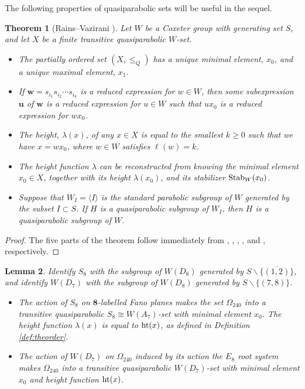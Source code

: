 \documentclass{amsart}
\theoremstyle{plain}
\newtheorem{theorem}{Theorem}[section]
\newtheorem{lemma}[theorem]{Lemma}
\theoremstyle{definition}
\theoremstyle{remark}
\numberwithin{equation}{section}
\newcommand{\bfw}{\mathbf{w}}
\newcommand{\Stab}{\text{\rm Stab}}
\newcommand{\rootht}{\text{\rm ht}}
\newcommand{\bfu}{\mathbf{u}}
\newcommand{\eight}{{\mathbf 8}}
\newcommand{\qpx}{\Omega_{240}}
\begin{document}
The following properties of quasiparabolic sets will be useful in the sequel.

\begin{theorem}[Rains--Vazirani \cite{rains13}]\label{thm:summary}
Let $W$ be a Coxeter group with generating set $S$, and let $X$ be a finite transitive quasiparabolic $W$-set.
\begin{itemize}
\item[{\rm (i)}]{The partially ordered set $(X, \leq_Q)$ has a unique minimal element, $x_0$, and a unique maximal
element, $x_1$.}
\item[{\rm (ii)}]{If $\bfw = s_{i_1} s_{i_2} \cdots s_{i_k}$ is a reduced expression for $w \in W$, then some 
subexpression $\bfu$ of $\bfw$ is a reduced expression for $u \in W$ such that $ux_0$ is a reduced expression
for $wx_0$.}
\item[{\rm (iii)}]{The height, $\lambda(x)$, of any $x \in X$ is equal to the smallest $k \geq 0$ such that we
have $x = w x_0$, where $w \in W$ satisfies $\ell(w) = k$.}
\item[{\rm (iv)}]{The height function $\lambda$ can be reconstructed from knowing the minimal element $x_0 \in X$,
together with its height $\lambda(x_0)$, and its stabilizer $\Stab_W(x_0)$.}
\item[{\rm (v)}]{Suppose that $W_I = \langle I \rangle$ is the standard parabolic subgroup of $W$ generated by
the subset $I \subset S$. If $H$ is a quasiparabolic subgroup of $W_I$, then $H$ is a quasiparabolic subgroup of $W$.}
\end{itemize}
\end{theorem}

\begin{proof}
The five parts of the theorem follow immediately from 
\cite[Corollary 2.10]{rains13}, \cite[Theorem 2.8 (ii)]{rains13}, \cite[Corollary 2.13]{rains13},
\cite[Proposition 2.15]{rains13}, and \cite[Corollary 3.10]{rains13}, respectively.
\end{proof}

\begin{lemma}\label{lem:s8d7}
Identify $S_8$ with the subgroup of $W(D_8)$ generated by $S \backslash \{\overline{(1, 2)}\}$, and identify $W(D_7)$
with the subgroup of $W(D_8)$ generated by $S \backslash \{(7, 8)\}$.
\begin{itemize}
\item[{\rm (i)}]{The action of $S_8$ on $\eight$-labelled Fano planes makes the set $\qpx$ into a transitive 
quasiparabolic  $S_8 \cong W(A_7)$-set with minimal element $x_0$. The height function $\lambda(x)$ is equal to 
$\rootht(x)$, as defined in Definition \ref{def:theorder}.}
\item[{\rm (ii)}]{The action of $W(D_7)$ on $\qpx$ induced by its action the $E_8$ root system makes $\qpx$
into a transitive quasiparabolic $W(D_7)$-set with minimal element $x_0$ and height function $\rootht(x)$.}
\end{itemize}
\end{lemma}
\end{document}
